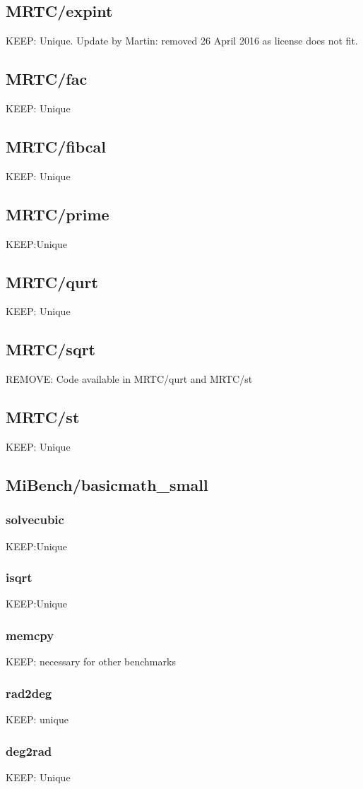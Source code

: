 \documentclass[a4paper]{article}
\begin{document}
\subsection{MRTC/expint}
	KEEP: Unique. Update by Martin: removed 26 April 2016 as license does not fit.
\subsection{MRTC/fac}
	KEEP: Unique
\subsection{MRTC/fibcal}
	KEEP: Unique
\subsection{MRTC/prime}
	KEEP:Unique
\subsection{MRTC/qurt}
	KEEP: Unique
\subsection{MRTC/sqrt}
	REMOVE: Code available in MRTC/qurt and MRTC/st
\subsection{MRTC/st}
	KEEP: Unique
\subsection{MiBench/basicmath\_small}
    \subsubsection{solvecubic}
    	KEEP:Unique
    \subsubsection{isqrt}
    	KEEP:Unique
    \subsubsection{memcpy}
    	KEEP: necessary for other benchmarks
    \subsubsection{rad2deg}
    	KEEP: unique
    \subsubsection{deg2rad}
    	KEEP: Unique
\end{document}
